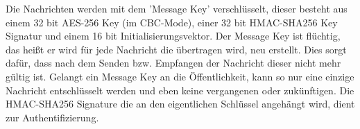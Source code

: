 Die Nachrichten werden mit dem 'Message Key' verschlüsselt, dieser besteht aus einem 32 bit AES-256 Key (im CBC-Mode), einer 32 bit HMAC-SHA256 Key Signatur und einem 16 bit Initialisierungsvektor. 
Der Message Key ist flüchtig, das heißt er wird für jede Nachricht die übertragen wird, neu erstellt.
Dies sorgt dafür, dass nach dem Senden bzw. Empfangen der Nachricht dieser nicht mehr 
gültig ist. Gelangt ein Message Key an die Öffentlichkeit, kann so nur eine einzige Nachricht
entschlüsselt werden und eben keine vergangenen oder zukünftigen.
Die HMAC-SHA256 Signature die an den eigentlichen Schlüssel angehängt wird, dient
zur Authentifizierung.\cite{ENCOV}



 
